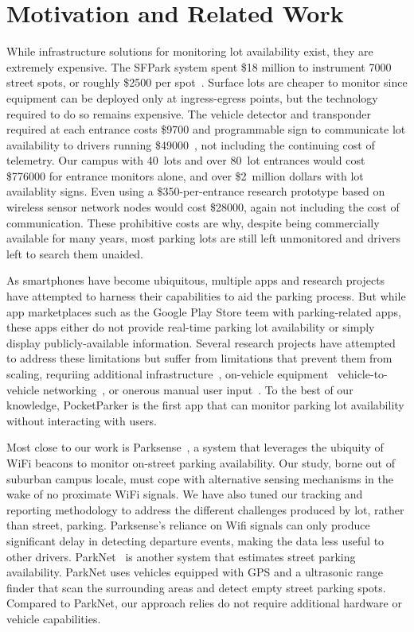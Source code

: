 \section{Motivation and Related Work}
\label{sec-related}

While infrastructure solutions for monitoring lot availability exist, they
are extremely expensive. The SFPark system spent \$18 million to instrument
\num{7000} street spots, or roughly \$\num{2500} per spot~\cite{sfpark}.
Surface lots are cheaper to monitor since equipment can be deployed only at
ingress-egress points, but the technology required to do so remains
expensive. The vehicle detector and transponder required at each entrance
costs \$\num{9700} and programmable sign to communicate lot availability to
drivers running \$\num{49000}~\cite{mstp-park}, not including the continuing
cost of telemetry. Our campus with 40~lots and over 80~lot entrances would
cost \$\num{776000} for entrance monitors alone, and over \$2~million dollars
with lot availablity signs. Even using a \$\num{350}-per-entrance research
prototype based on wireless sensor network nodes would cost \$\num{28000},
again not including the cost of communication. These prohibitive costs are
why, despite being commercially available for many years, most parking lots
are still left unmonitored and drivers left to search them unaided.

As smartphones have become ubiquitous, multiple apps and research projects
have attempted to harness their capabilities to aid the parking process. But
while app marketplaces such as the Google Play Store teem with
parking-related apps, these apps either do not provide real-time parking lot
availability or simply display publicly-available information. Several
research projects have attempted to address these limitations but suffer from
limitations that prevent them from scaling, requriing additional
infrastructure~\cite{5062057}, on-vehicle equipment~\cite{Mathur:2010:PDS}
vehicle-to-vehicle networking~\cite{Delot:2009:CRP, Mathur:2010:PDS}, or
onerous manual user input~\cite{Chen:2012:COS}. To the best of our knowledge,
PocketParker is the first app that can monitor parking lot availability
without interacting with users.

Most close to our work is Parksense~\cite{Nawaz:2013:PSB}, a system that
leverages the ubiquity of WiFi beacons to monitor on-street parking
availability. Our study, borne out of suburban campus locale, must cope with
alternative sensing mechanisms in the wake of no proximate WiFi signals. We
have also tuned our tracking and reporting methodology to address the
different challenges produced by lot, rather than street, parking.
Parksense's reliance on Wifi signals can only produce significant delay in
detecting departure events, making the data less useful to other drivers.
ParkNet~\cite{Mathur:2010:PDS} is another system that estimates street
parking availability. ParkNet uses vehicles equipped with GPS and a
ultrasonic range finder that scan the surrounding areas and detect empty
street parking spots. Compared to ParkNet, our approach relies do not require
additional hardware or vehicle capabilities.

